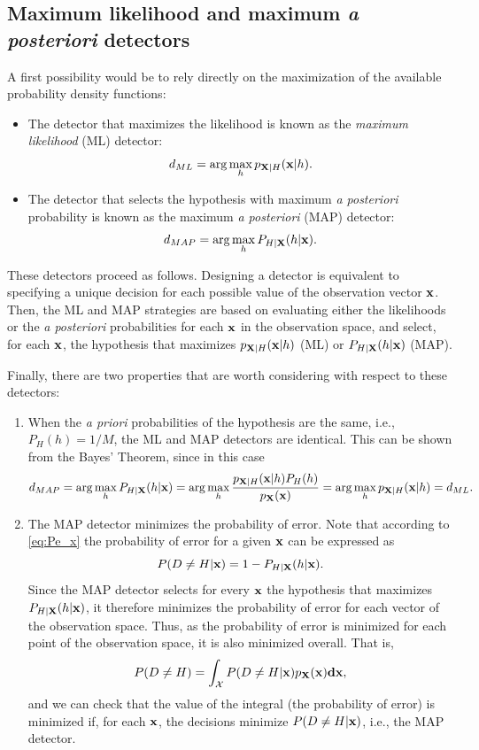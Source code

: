 \subsection{Maximum likelihood and maximum \emph{a posteriori} detectors}

A first possibility would be to rely directly on the maximization of the available probability density functions:

\begin{itemize}
    \item The detector that maximizes the likelihood is known as the {\em maximum likelihood} (ML) detector:
    $$d_{ML} = \arg\max_h p_{{\bf X}|H}({\bf x}|h).$$
    \item The detector that selects the hypothesis with maximum {\em a posteriori} probability is known as the  maximum {\em a posteriori} (MAP) detector:
    $$d_{MAP} = \arg\max_h P_{H|{\bf X}}(h|{\bf x}).$$
\end{itemize}

These detectors proceed as follows. Designing a detector is equivalent to specifying a unique decision for each possible value of the observation vector ${\bf x}$. Then, the ML and MAP strategies are based on evaluating either the likelihoods or the {\em a posteriori} probabilities for each ${\bf x}$ in the observation space, and select, for each ${\bf x}$, the hypothesis that maximizes $p_{{\bf X}|H}({\bf x}|h)$ (ML) or $P_{H|{\bf X}}(h|{\bf x})$ (MAP).

Finally, there are two properties that are worth considering with respect to these detectors:
\begin{enumerate}
    \item When the {\em a priori} probabilities of the hypothesis are the same, i.e., $P_H(h) = 1/M$, the ML and MAP detectors are identical. This can be shown from the Bayes' Theorem, since in this case
    $$d_{MAP} = \arg\max_h P_{H|{\bf X}}(h|{\bf x}) = \arg\max_h \frac{p_{{\bf X}|H}({\bf x}|h) P_H(h)}{p_{\bf X}(\bf x)} = \arg\max_h p_{{\bf X}|H}({\bf x}|h) = d_{ML}.$$
    
    \item The MAP detector minimizes the probability of error. Note that according to \eqref{eq:Pe_x} the probability of error for a given $\bf x$ can be expressed as
    $$P(D\neq H|{\bf x}) = 1 - P_{ H|{\bf X}}(h|{\bf x}).$$
    Since the MAP detector selects for every $\bf x$ the hypothesis that maximizes $P_{H|{\bf X}}(h|{\bf x})$, it therefore minimizes the probability of error for each vector of the observation space. Thus, as the probability of error is minimized for each point of the observation space, it is also minimized overall. That is,
    $$P(D\neq H) = \int_{\mathcal{X}} P(D\neq H|{\bf x}) p_{\bf X}(\bf x) d{\bf x},$$
    and we can check that the value of the integral (the probability of error) is minimized if, for each $\bf x$, the decisions minimize $P(D\neq H|{\bf x})$, i.e., the MAP detector.
    
\end{enumerate}

